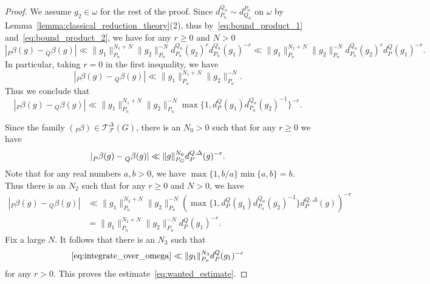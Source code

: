 \documentclass[letterpaper,11pt]{amsart}
\newcommand{\cF}{\mathcal{F}}
\newcommand{\cT}{\mathcal{T}}
\newcommand{\<}{\negthickspace}
\providecommand{\abs}[1]{\lvert#1\rvert}
\providecommand{\aabs}[1]{\lVert#1\rVert}
\theoremstyle{definition}
\theoremstyle{plain}
\theoremstyle{remark}
\numberwithin{equation}{section}
\begin{document}
\begin{proof}
We assume $g_2 \in \omega$ for the rest of the proof.
Since $d_{P_{n}}^{Q_{n}} \sim d_{Q_{n}}^{P_{n}}$ on $\omega$ by
Lemma~\ref{lemma:classical_reduction_theory}(2), thus by~\eqref{eq:bound_product_1}
and~\eqref{eq:bound_product_2}, we have for any $r \ge 0$ and $N > 0$
    \[
    \left| {}_P \beta (g) - {}_Q \beta (g) \right|
    \ll \| g_1 \|_{P_n}^{N_1+N} \| g_2 \|_{P_n}^{-N}
    d_{P_{n}}^{Q_{n}}(g_2)^r d_{P_{n}}^{Q_{n}}(g_1)^{-r}
    \ll
    \| g_1 \|_{P_n}^{N_1+N} \| g_2 \|_{P_n}^{-N}
    d_{P_{n}}^{Q_{n}}(g_2)^r d_{P}^{Q}(g_1)^{-r}.
    \]
In particular, taking $r=0$ in the first inequality, we have
    \begin{equation*}
    \left| {}_P \beta (g) - {}_Q \beta (g) \right|
    \ll \| g_1 \|_{P_n}^{N_1+N} \| g_2 \|_{P_n}^{-N}.
    \end{equation*}
Thus we conclude that
    \[
    \left| {}_P \beta (g) - {}_Q \beta (g) \right|
    \ll \| g_1 \|_{P_n}^{N_1+N} \| g_2 \|_{P_n}^{-N}
    \max \{1,  d_{P}^{Q}(g_1) d_{P_{n}}^{Q_{n}}(g_2)^{-1} \}^{-r}.
    \]


Since the family $({}_P \beta) \in \cT_\cF^\Delta(G)$, there is an $N_0>0$ such that for any $r \geq 0$ we have
    \[
    \abs{\prescript{}{P}{\beta}(g) - \prescript{}{Q}{\beta}(g)}
    \ll \aabs{g}_{P_G}^{N_0} d_{P}^{Q, \Delta}(g)^{-r}.
    \]
Note that for any real numbers $a,b>0$, we have
$\max\{1,b/a\} \min\{a,b\}=b$.
Thus there is an $N_2$ such that for any $ r \ge 0$ and $N>0$, we have
    \begin{align*}
    \left| {}_P \beta (g) - {}_Q \beta (g) \right|
    &\ll \| g_1 \|_{P_n}^{N_2+N} \| g_2 \|_{P_n}^{-N}
    \left(\max\{1,d_{P}^{Q}(g_1)d_{P_{n}}^{Q_{n}}(g_2)^{-1}\}
    d_P^{Q,\Delta}(g)\right)^{-r} \\
    &= \| g_1 \|_{P_n}^{N_2+N}
    \| g_2 \|_{P_n}^{-N}  d_{P}^{Q}(g_1)^{-r}.
    \end{align*}
Fix a large $N$. It follows that there is an $N_3$ such that
    \[
    \eqref{eq:integrate_over_omega}\ll \aabs{g_1}_{P_n}^{N_3} d_{P}^Q(g_1)^{-r}
    \]
for any $r >0$. This proves the estimate~\eqref{eq:wanted_estimate}.
\end{proof}
\end{document}
